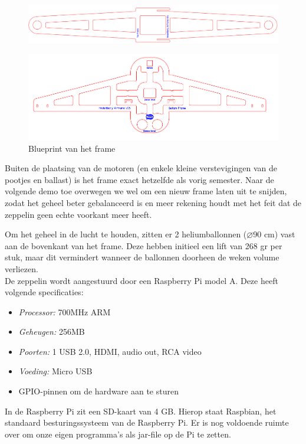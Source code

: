 \documentclass[tt]{penoverslag}
\begin{document}
\begin{figure}[h!]
\centering
\includegraphics[scale=0.3]{upperFrame.png}
\label{frame}
\end{figure}

\begin{figure}[h!]
\centering
\includegraphics[scale=0.3]{lowerFrame.png}
\caption{Blueprint van het frame}
\label{frame}
\end{figure}

Buiten de plaatsing van de motoren (en enkele kleine verstevigingen van de pootjes en ballast) is het frame exact hetzelfde als vorig semester. Naar de volgende demo toe overwegen we wel om een nieuw frame laten uit te snijden, zodat het geheel beter gebalanceerd is en meer rekening houdt met het feit dat de zeppelin geen echte voorkant meer heeft.

Om het geheel in de lucht te houden, zitten er 2 heliumballonnen ($\diameter$90 cm) vast aan de bovenkant van het frame. Deze hebben initieel een lift van 268 gr per stuk, maar dit vermindert wanneer de ballonnen doorheen de weken volume verliezen. \\

De zeppelin wordt aangestuurd door een Raspberry Pi model A. Deze heeft volgende specificaties:
\begin{itemize}
\item \emph{Processor:} 700MHz ARM
\item \emph{Geheugen:} 256MB
\item \emph{Poorten:} 1 USB 2.0, HDMI, audio out, RCA video
\item \emph{Voeding:} Micro USB
\item GPIO-pinnen om de hardware aan te sturen
\end{itemize}

In de Raspberry Pi zit een SD-kaart van 4 GB. Hierop staat Raspbian, het standaard besturingssysteem van de Raspberry Pi. Er is nog voldoende ruimte over om onze eigen programma's als jar-file op de Pi te zetten. \\
\end{document}
